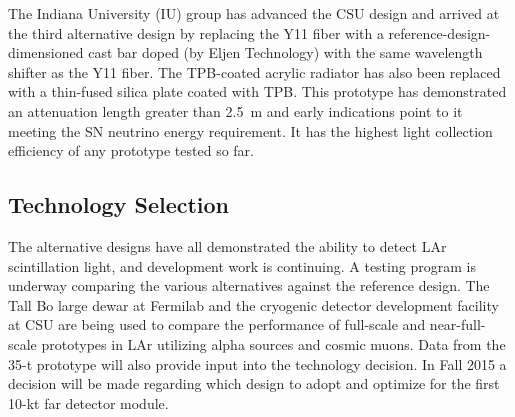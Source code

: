 The Indiana University (IU) group has advanced the CSU design and arrived
at the third alternative design by replacing the Y11 fiber with a
reference-design-dimensioned cast bar doped (by Eljen Technology) with
the same wavelength shifter as the Y11 fiber. The TPB-coated acrylic
radiator has also been replaced with a thin-fused silica plate coated
with TPB. This prototype has demonstrated an attenuation length
greater than 2.5~m and early indications point to it meeting the SN neutrino energy requirement. It has the highest light collection efficiency of any prototype tested so far.

\subsection{Technology Selection}

The alternative designs have all demonstrated the ability to detect
LAr scintillation light, and development work is continuing. A testing
program is underway comparing the various alternatives against the
reference design.  The Tall Bo large dewar at Fermilab and the
cryogenic detector development facility at CSU are being used to
compare the performance of full-scale and near-full-scale prototypes
in LAr utilizing alpha sources and cosmic muons. Data from the 35-t
prototype will also provide input into the technology decision. In
Fall 2015 a decision will be made regarding which design to adopt and
optimize for the first 10-kt far detector module.
